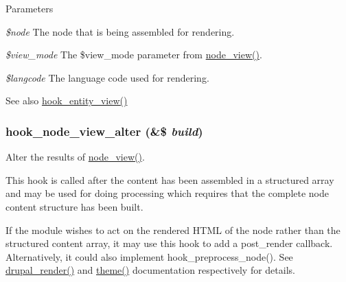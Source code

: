 \begin{DoxyParams}{Parameters}
\item[{\em \$node}]The node that is being assembled for rendering. \item[{\em \$view\_\-mode}]The \$view\_\-mode parameter from \hyperlink{node_8module_ac2c64fdfacc25be79a6ecf406ab62320}{node\_\-view()}. \item[{\em \$langcode}]The language code used for rendering.\end{DoxyParams}
\begin{DoxySeeAlso}{See also}
\hyperlink{group__hooks_gae273ba271c2ef1192fe135afa9da5d49}{hook\_\-entity\_\-view()} 
\end{DoxySeeAlso}
\hypertarget{group__node__api__hooks_gad5ece824736be57bf0020af900398b94}{
\subsubsection[{hook\_\-node\_\-view\_\-alter}]{\setlength{\rightskip}{0pt plus 5cm}hook\_\-node\_\-view\_\-alter (\&\$ {\em build})}}
\label{group__node__api__hooks_gad5ece824736be57bf0020af900398b94}
Alter the results of \hyperlink{node_8module_ac2c64fdfacc25be79a6ecf406ab62320}{node\_\-view()}.

This hook is called after the content has been assembled in a structured array and may be used for doing processing which requires that the complete node content structure has been built.

If the module wishes to act on the rendered HTML of the node rather than the structured content array, it may use this hook to add a post\_\-render callback. Alternatively, it could also implement hook\_\-preprocess\_\-node(). See \hyperlink{common_8inc_a05798b44e8d6c496d4bee5cc32fa7851}{drupal\_\-render()} and \hyperlink{includes_2theme_8inc_a7c25609a935874541a19657affd30fff}{theme()} documentation respectively for details.


